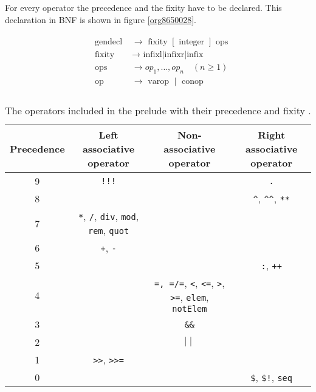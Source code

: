 \documentclass[a4paper, titlepage, twoside]{article}
\begin{document}
For every operator the precedence and the fixity have to be declared. This declaration in BNF is shown in figure \ref{org8650028}.

\begin{figure}
\begin{displaymath}
\begin{aligned}
&\begin{array}{ll}
\text { gendecl } & \rightarrow \text { fixity }[\text { integer }] \text { ops } \\
\text { fixity } & \rightarrow \text { infixl|infixr|infix } \\
\text { ops } & \rightarrow o p_1, \ldots, o p_n \quad(n \geq 1) \\
\text { op } & \rightarrow \text { varop } \mid \text { conop }
\end{array}\\
\end{aligned}
\end{displaymath}
\end{figure}


\begin{sidewaystable}[htbp]
\caption{\label{tab:org6be8bd9}The operators included in the prelude with their precedence and fixity \autocite{marlowHaskell2010Language2010}.}
\centering
\begin{tabular}{c|c|c|c}
\hline
Precedence & Left associative operator & Non-associative operator & Right associative operator\\[0pt]
\hline
9 & \texttt{!!!} &  & \texttt{.}\\[0pt]
8 &  &  & \texttt{\textasciicircum{}}, \texttt{\textasciicircum{}\textasciicircum{}}, \texttt{**}\\[0pt]
7 & \texttt{*}, \texttt{/}, \texttt{div}, \texttt{mod}, \texttt{rem}, \texttt{quot} &  & \\[0pt]
6 & \texttt{+}, \texttt{-} &  & \\[0pt]
5 &  &  & \texttt{:}, \texttt{++}\\[0pt]
4 &  & \texttt{=, =/=}, \texttt{<}, \texttt{<=}, \texttt{>}, \texttt{>=}, \texttt{elem}, \texttt{notElem} & \\[0pt]
3 &  & \texttt{\&\&} & \\[0pt]
2 &  & \(\mid \mid\) & \\[0pt]
1 & \texttt{>{}>{}}, \texttt{>{}>{}=} &  & \\[0pt]
0 &  &  & \texttt{\$}, \texttt{\$!}, \texttt{seq}\\[0pt]
\hline
\end{tabular}
\end{sidewaystable}
\end{document}
